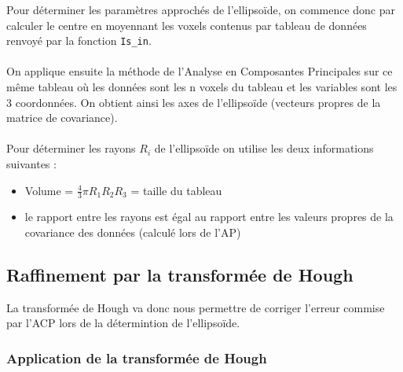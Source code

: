 \documentclass{article}
\begin{document}
Pour déterminer les paramètres approchés de l'ellipsoïde, on commence donc par calculer le centre en moyennant les voxels contenus par tableau de données renvoyé par la fonction \texttt{Is\_in}. \\\\
On applique ensuite la méthode de l'Analyse en Composantes Principales sur ce même tableau où les données sont les n voxels du tableau et les variables sont les 3 coordonnées. On obtient ainsi les axes de l'ellipsoïde (vecteurs propres de la matrice de covariance).\\\\
Pour déterminer les rayons $R_i$ de l'ellipsoïde on utilise les deux informations suivantes :
\begin{itemize}
	\item Volume = $\frac{4}{3} \pi R_1R_2R_3$ = taille du tableau
	\item le rapport entre les rayons est égal au rapport entre les valeurs propres de la covariance des données (calculé lors de l'AP)
\end{itemize}

\subsection{Raffinement par la transformée de Hough}

La transformée de Hough \cite{bib:Hough, bib:genHough} va donc nous permettre de corriger l'erreur commise par l'ACP lors de la détermintion de l'ellipsoïde.

\subsubsection{Application de la transformée de Hough}
\end{document}
